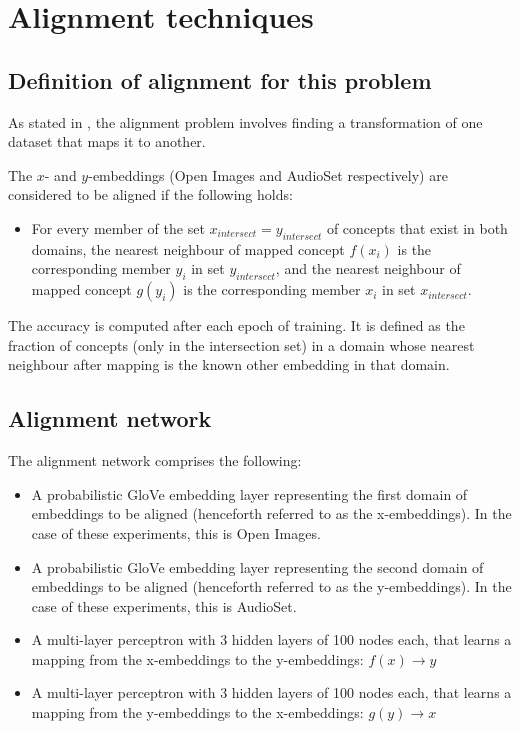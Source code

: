 \section{Alignment techniques}

\subsection{Definition of alignment for this problem}

As stated in \cite{ManifoldLearningTheoryAndApplications}, the alignment problem involves finding a transformation of one dataset that maps it to another. 

The $x$- and $y$-embeddings (Open Images and AudioSet respectively) are considered to be aligned if the following holds:

\begin{itemize}
    \item For every member of the set $x_{intersect} = y_{intersect}$ of concepts that exist in both domains, the nearest neighbour of mapped concept $f(x_i)$ is the corresponding member $y_i$ in set $y_{intersect}$, and the nearest neighbour of mapped concept $g(y_i)$ is the corresponding member $x_i$ in set $x_{intersect}$. 
\end{itemize}

The accuracy is computed after each epoch of training. It is defined as the fraction of concepts (only in the intersection set) in a domain whose nearest neighbour after mapping is the known other embedding in that domain. 

\subsection{Alignment network}

The alignment network comprises the following:

\begin{itemize}
    \item A probabilistic GloVe embedding layer representing the first domain of embeddings to be aligned (henceforth referred to as the x-embeddings). In the case of these experiments, this is Open Images. 
    \item A probabilistic GloVe embedding layer representing the second domain of embeddings to be aligned (henceforth referred to as the y-embeddings). In the case of these experiments, this is AudioSet. 
    \item A multi-layer perceptron with 3 hidden layers of 100 nodes each, that learns a mapping from the x-embeddings to the y-embeddings: $f(x) \rightarrow y$
    \item A multi-layer perceptron with 3 hidden layers of 100 nodes each, that learns a mapping from the y-embeddings to the x-embeddings: $g(y) \rightarrow x$
\end{itemize}

